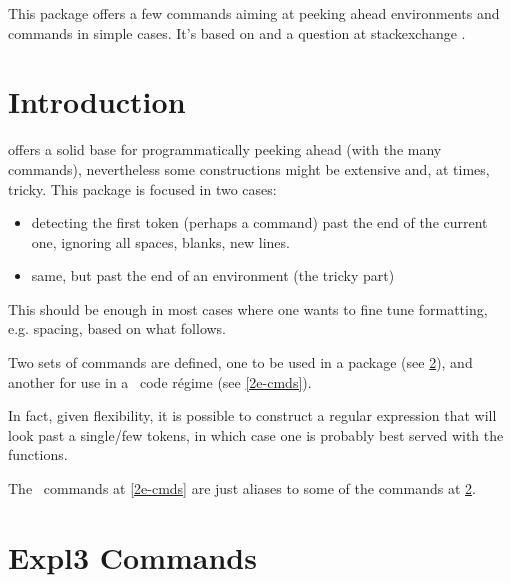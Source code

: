\documentclass[10pt]{article}
\begin{document}
  

\begin{typesetabstract}
 
This package offers a few commands aiming at peeking ahead environments and commands in simple cases. It's based on  and a question at stackexchange \cite{stackexchange}.

\end{typesetabstract}

\tableofcontents

\section{Introduction}

 offers a solid base for programmatically peeking ahead (with the many \tsobj{\peek_} commands), nevertheless some constructions might be extensive and, at times, tricky. This package is focused in two cases:
\begin{itemize}
  \item detecting the first token (perhaps a command) past the end of the current one, ignoring all spaces, blanks, new lines.
  \item same, but past the end of an environment (the tricky part)
\end{itemize}
This should be enough in most cases where one wants to fine tune formatting, e.g. spacing, based on what follows. 

Two sets of commands are defined, one to be used in a  package (see \ref{expl3-cmds}), and another for use in a \LaTeXe\ code régime (see \ref{2e-cmds}).
\begin{tsremark}
  In fact, given  flexibility, it is possible to construct a regular expression that will look past a single/few tokens, in which case one is probably best served with the  \tsobj{\peek_} functions.
\end{tsremark}
\begin{tsremark}
  The \LaTeXe\ commands at \ref{2e-cmds} are just aliases to some of the  commands at \ref{expl3-cmds}.
\end{tsremark}


\newpage
\section{Expl3 Commands}\label{expl3-cmds}
\end{document}
